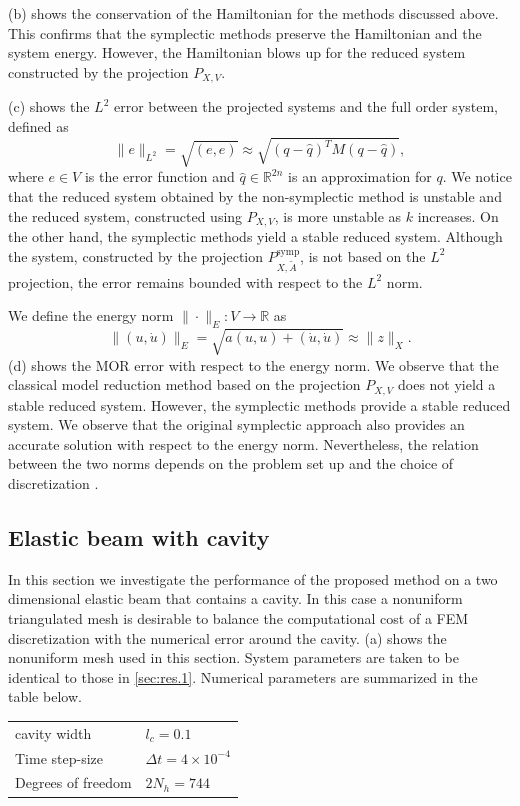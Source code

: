 (b) shows the conservation of the Hamiltonian for the methods discussed above. This confirms that the symplectic methods preserve the Hamiltonian and the system energy. However, the Hamiltonian blows up for the reduced system constructed by the projection $P_{X,V}$.

(c) shows the $L^2$ error between the projected systems and the full order system, defined as
\begin{equation}
	\| e \|_{L^2} = \sqrt{(e,e)} \approx \sqrt{ (q - \hat q)^T M (q-\hat q) },
\end{equation}
where $e\in V$ is the error function and $\hat q \in \mathbb R^{2n}$ is an approximation for $q$. We notice that the reduced system obtained by the non-symplectic method is unstable and the reduced system, constructed using $P_{X,V}$, is more unstable as $k$ increases. On the other hand, the symplectic methods yield a stable reduced system. Although the system, constructed by the projection $P^{\text{symp}}_{X,\tilde A}$, is not based on the $L^2$ projection, the error remains bounded with respect to the $L^2$ norm. 

We define the energy norm $\| \cdot \|_E : V \to \mathbb R$ as
\begin{equation}
	\| (u,\dot u) \|_E = \sqrt{ a(u,u) + (\dot u , \dot u) } \approx \| z \|_X.
\end{equation}
(d) shows the MOR error with respect to the energy norm. We observe that the classical model reduction method based on the projection $P_{X,V}$ does not yield a stable reduced system. However, the symplectic methods provide a stable reduced system. We observe that the original symplectic approach also provides an accurate solution with respect to the energy norm. Nevertheless, the relation between the two norms depends on the problem set up and the choice of discretization \cite{DEPARIS20094359}.

\subsection{Elastic beam with cavity}  \label{sec:res.1.1}
In this section we investigate the performance of the proposed method on a two dimensional elastic beam that contains a cavity. In this case a nonuniform triangulated mesh is desirable to balance the computational cost of a FEM discretization with the numerical error around the cavity. (a) shows the nonuniform mesh used in this section.
System parameters are taken to be identical to those in \cref{sec:res.1}. Numerical parameters are summarized in the table below.
\vspace{0.5cm}
\begin{center}
\begin{tabular}{|l|l|}
\hline
cavity width & $l_c = 0.1$ \\
Time step-size & $\Delta t = 4\times 10^{-4}$ \\
Degrees of freedom & $2N_{h} = 744$ \\
\hline
\end{tabular}
\end{center}
\vspace{0.5cm}


